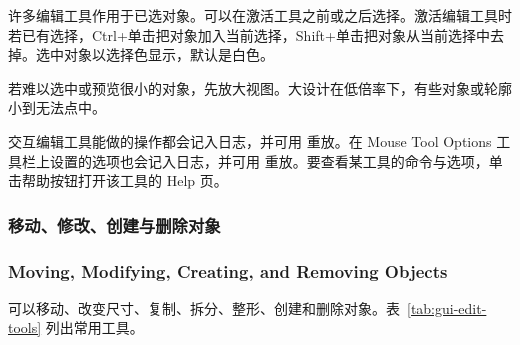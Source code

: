 许多编辑工具作用于已选对象。可以在激活工具之前或之后选择。激活编辑工具时若已有选择，Ctrl+单击把对象加入当前选择，Shift+单击把对象从当前选择中去掉。选中对象以选择色显示，默认是白色。

\begin{noteBox}
若难以选中或预览很小的对象，先放大视图。大设计在低倍率下，有些对象或轮廓小到无法点中。
\end{noteBox}

交互编辑工具能做的操作都会记入日志，并可用  重放。在 Mouse Tool Options 工具栏上设置的选项也会记入日志，并可用  重放。要查看某工具的命令与选项，单击帮助按钮打开该工具的 Help 页。

\subsubsection{移动、修改、创建与删除对象}
\subsubsection*{Moving, Modifying, Creating, and Removing Objects}

可以移动、改变尺寸、复制、拆分、整形、创建和删除对象。表~\ref{tab:gui-edit-tools} 列出常用工具。


